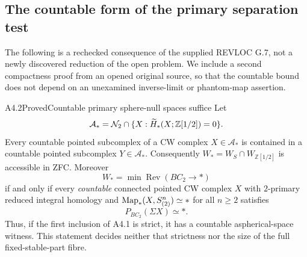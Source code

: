 \subsection{The countable form of the primary separation test}

The following is a rechecked consequence of the supplied REVLOC G.7,
not a newly discovered reduction of the open problem.  We include a
second compactness proof from an opened original source, so that the
countable bound does not depend on an unexamined inverse-limit or
phantom-map assertion.

\begin{claim}{A4.2}{Proved}{Countable primary sphere-null spaces suffice}
\label{A42}
Let
\[
 \mathcal A_* = \mathcal N_2\cap
 \{X:\widetilde H_*(X;\mathbb Z[1/2])=0\}.
\]
Every countable pointed subcomplex of a CW complex $X\in\mathcal A_*$
is contained in a countable pointed subcomplex $Y\in\mathcal A_*$.
Consequently $W_*=W_S\cap W_{\mathbb Z[1/2]}$ is accessible in ZFC.
Moreover
\[
 W_*=\min\operatorname{Rev}(BC_2\to *)
\]
if and only if every \emph{countable} connected pointed CW complex $X$
with $2$-primary reduced integral homology and
$\operatorname{Map}_*(X,S^n_{(2)})\simeq *$ for all $n\geq2$ satisfies
\[
                       P_{BC_2}(\Sigma X)\simeq *.
 \tag{A4.2.1}
\]
Thus, if the first inclusion of A4.1 is strict, it has a countable
aspherical-space witness.  This statement decides neither that
strictness nor the size of the full fixed-stable-part fibre.
\end{claim}
